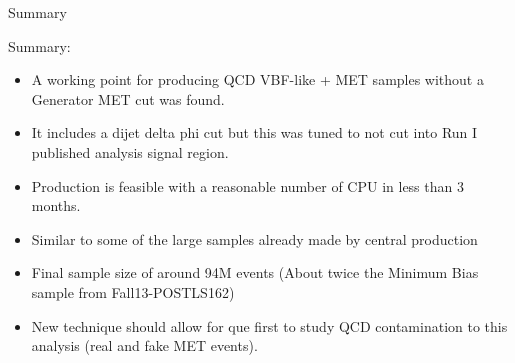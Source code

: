 \documentclass[8pt]{beamer}
\begin{document}
\begin{frame}{Summary}
 
\begin{block}{Summary:}
 
\begin{itemize}
  \item A working point for producing QCD VBF-like + MET samples without a Generator MET cut was found.
  \item It includes a dijet delta phi cut but this was tuned to not cut into Run I published analysis signal region.
  \item Production is feasible with a reasonable number of CPU in less than 3 months.
  \item Similar to some of the large samples already made by central production 
  \item Final sample size of around 94M events (About twice the Minimum Bias sample from Fall13-POSTLS162)
  \item New technique should allow for que first to study QCD contamination to this analysis (real and fake MET events).
\end{itemize}

\end{block}

\end{frame}
\end{document}
